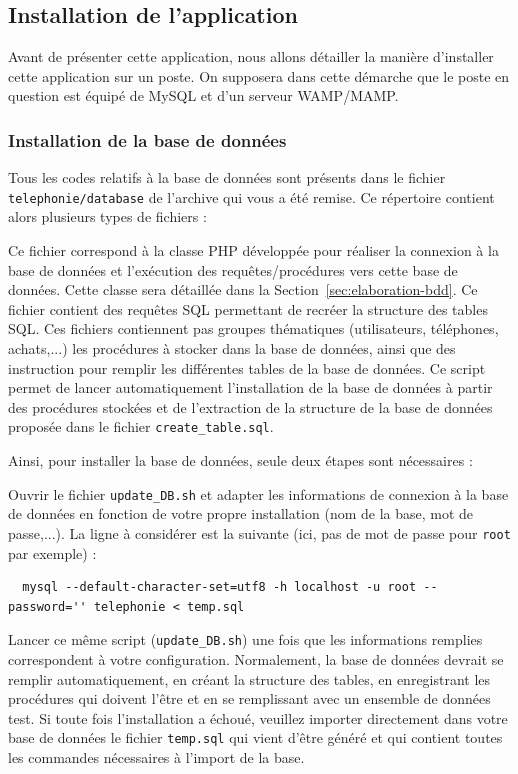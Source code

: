 \subsection{Installation de l'application}
Avant de présenter cette application, nous allons détailler la manière d'installer cette application sur un poste. On supposera dans cette démarche que le poste en question est équipé de MySQL et d'un serveur WAMP/MAMP.

\subsubsection{Installation de la base de données}
Tous les codes relatifs à la base de données sont présents dans le fichier \texttt{telephonie/database} de l'archive qui vous a été remise. Ce répertoire contient alors plusieurs types de fichiers :
\begin{itemize}
  Ce fichier correspond à la classe PHP développée pour réaliser la connexion à la base de données et l'exécution des requêtes/procédures vers cette base de données. Cette classe sera détaillée dans la Section~\ref{sec:elaboration-bdd}.
  Ce fichier contient des requêtes SQL permettant de recréer la structure des tables SQL.
  Ces fichiers contiennent pas groupes thématiques (utilisateurs, téléphones, achats,...) les procédures à stocker dans la base de données, ainsi que des instruction pour remplir les différentes tables de la base de données.
  Ce script permet de lancer \og automatiquement\fg{} l'installation de la base de données à partir des procédures stockées et de l'extraction de la structure de la base de données proposée dans le fichier \texttt{create\_table.sql}.
\end{itemize}

Ainsi, pour installer la base de données, seule deux étapes sont nécessaires :
\begin{itemize}
  Ouvrir le fichier \texttt{update\_DB.sh} et adapter les informations de connexion à la base de données en fonction de votre propre installation (nom de la base, mot de passe,...). La ligne à considérer est la suivante (ici, pas de mot de passe pour \texttt{root} par exemple) :
\begin{lstlisting}
  mysql --default-character-set=utf8 -h localhost -u root --password='' telephonie < temp.sql
\end{lstlisting}
  Lancer ce même script (\texttt{update\_DB.sh}) une fois que les informations remplies correspondent à votre configuration. Normalement, la base de données devrait se remplir automatiquement, en créant la structure des tables, en enregistrant les procédures qui doivent l'être et en se remplissant avec un ensemble de données test. Si toute fois l'installation a échoué, veuillez importer directement dans votre base de données le fichier \texttt{temp.sql} qui vient d'être généré et qui contient toutes les commandes nécessaires à l'import de la base.
\end{itemize}

